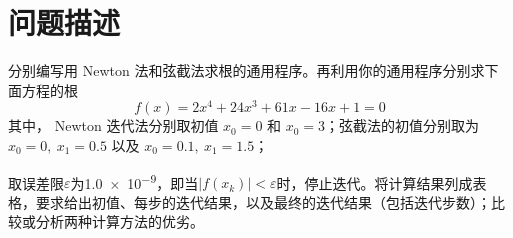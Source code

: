 \documentclass[11pt]{article}
\begin{document}
\maketitle %

\thispagestyle{empty} %

\newpage

\section{问题描述}
分别编写用 Newton 法和弦截法求根的通用程序。再利用你的通用程序分别求下面方程的根
$$
    f(x) = 2x^4 + 24x^3 + 61x - 16x + 1 = 0
$$
其中， Newton 迭代法分别取初值 $x_0 = 0$ 和 $x_0 = 3$；弦截法的初值分别取为 $x_0 = 0,\ x_1 = 0.5$ 以及 $x_0 = 0.1,\ x_1 = 1.5$；

取误差限$\varepsilon$为\num{1.0e-9}，即当$|f(x_k)| < \varepsilon$时，停止迭代。将计算结果列成表格，要求给出初值、每步的迭代结果，以及最终的迭代结果（包括迭代步数）；比较或分析两种计算方法的优劣。
\end{document}
